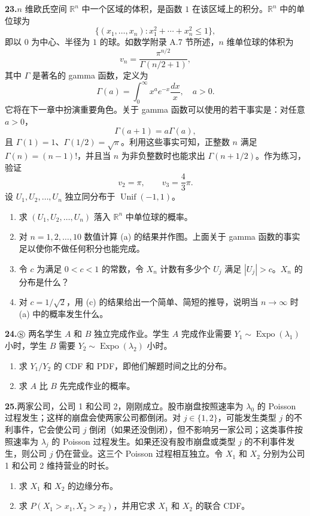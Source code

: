 \documentclass[UTF8,12pt,a4paper,fontset=fandol]{ctexart}
\begin{document}
\noindent\textbf{23.}\quad $n$ 维欧氏空间 $\mathbb{R}^n$ 中一个区域的体积，是函数 $1$ 在该区域上的积分。$\mathbb{R}^n$ 中的单位球为
\[
  \{(x_1,\ldots,x_n):x_1^2+\cdots+x_n^2\le 1\},
\]
即以 $0$ 为中心、半径为 $1$ 的球。如数学附录 A.7 节所述，$n$ 维单位球的体积为
\[
  v_n=\frac{\pi^{n/2}}{\Gamma(n/2+1)},
\]
其中 $\Gamma$ 是著名的 gamma 函数，定义为
\[
  \Gamma(a)=\int_0^\infty x^a e^{-x}\frac{dx}{x},\quad a>0.
\]
它将在下一章中扮演重要角色。关于 gamma 函数可以使用的若干事实是：对任意 $a>0$，
\[
  \Gamma(a+1)=a\Gamma(a),
\]
且 $\Gamma(1)=1$、$\Gamma(1/2)=\sqrt{\pi}$。利用这些事实可知，正整数 $n$ 满足 $\Gamma(n)=(n-1)!$，并且当 $n$ 为非负整数时也能求出 $\Gamma(n+1/2)$。作为练习，验证
\[
  v_2=\pi,\qquad v_3=\frac43\pi.
\]
设 $U_1,U_2,\ldots,U_n$ 独立同分布于 $\operatorname{Unif}(-1,1)$。
\begin{enumerate}
  \item[(a)] 求 $(U_1,U_2,\ldots,U_n)$ 落入 $\mathbb{R}^n$ 中单位球的概率。
  \item[(b)] 对 $n=1,2,\ldots,10$ 数值计算 (a) 的结果并作图。上面关于 gamma 函数的事实足以使你不做任何积分也能完成。
  \item[(c)] 令 $c$ 为满足 $0<c<1$ 的常数，令 $X_n$ 计数有多少个 $U_j$ 满足 $|U_j|>c$。$X_n$ 的分布是什么？
  \item[(d)] 对 $c=1/\sqrt2$，用 (c) 的结果给出一个简单、简短的推导，说明当 $n\to\infty$ 时 (a) 中的概率发生什么。
\end{enumerate}

\noindent\textbf{24.}\quad $\circledS$ 两名学生 $A$ 和 $B$ 独立完成作业。学生 $A$ 完成作业需要 $Y_1\sim \operatorname{Expo}(\lambda_1)$ 小时，学生 $B$ 需要 $Y_2\sim \operatorname{Expo}(\lambda_2)$ 小时。
\begin{enumerate}
  \item[(a)] 求 $Y_1/Y_2$ 的 CDF 和 PDF，即他们解题时间之比的分布。
  \item[(b)] 求 $A$ 比 $B$ 先完成作业的概率。
\end{enumerate}

\noindent\textbf{25.}\quad 两家公司，公司 1 和公司 2，刚刚成立。股市崩盘按照速率为 $\lambda_0$ 的 Poisson 过程发生；这样的崩盘会使两家公司都倒闭。对 $j\in\{1,2\}$，可能发生类型 $j$ 的不利事件，它会使公司 $j$ 倒闭（如果还没倒闭），但不影响另一家公司；这类事件按照速率为 $\lambda_j$ 的 Poisson 过程发生。如果还没有股市崩盘或类型 $j$ 的不利事件发生，则公司 $j$ 仍在营业。这三个 Poisson 过程相互独立。令 $X_1$ 和 $X_2$ 分别为公司 1 和公司 2 维持营业的时长。
\begin{enumerate}
  \item[(a)] 求 $X_1$ 和 $X_2$ 的边缘分布。
  \item[(b)] 求 $P(X_1>x_1,X_2>x_2)$，并用它求 $X_1$ 和 $X_2$ 的联合 CDF。
\end{enumerate}
\end{document}
